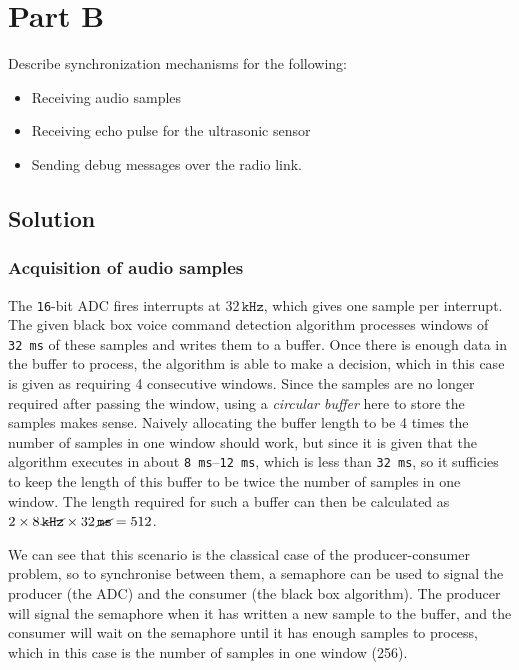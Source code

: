 \section*{Part B}

Describe synchronization mechanisms for the following:
\begin{itemize}[noitemsep, topsep=0pt]
    \item Receiving audio samples
    \item Receiving echo pulse for the ultrasonic sensor
    \item Sending debug messages over the radio link.
\end{itemize}

\subsection*{Solution}

\subsubsection*{Acquisition of audio samples}

The \texttt{16}-bit ADC fires interrupts at \( 32\,\texttt{kHz} \), which gives one sample per interrupt.
The given black box voice command detection algorithm processes windows of \texttt{32\,ms} of these samples and writes them to a buffer.
Once there is enough data in the buffer to process, the algorithm is able to make a decision, which in this case is given as requiring 4 consecutive windows.
Since the samples are no longer required after passing the window, using a \textit{circular buffer} here to store the samples makes sense.
Naively allocating the buffer length to be 4 times the number of samples in one window should work, but since it is given that the algorithm executes in about \texttt{8\,ms}--\texttt{12\,ms}, which is less than \texttt{32\,ms}, so it sufficies to keep the length of this buffer to be twice the number of samples in one window.
The length required for such a buffer can then be calculated as \( 2 \times 8\,\cancel{\texttt{kHz}} \times 32\,\cancel{\texttt{ms}} = 512 \).

We can see that this scenario is the classical case of the producer-consumer problem, so to synchronise between them, a semaphore can be used to signal the producer (the ADC) and the consumer (the black box algorithm).
The producer will signal the semaphore when it has written a new sample to the buffer, and the consumer will wait on the semaphore until it has enough samples to process, which in this case is the number of samples in one window (256).

